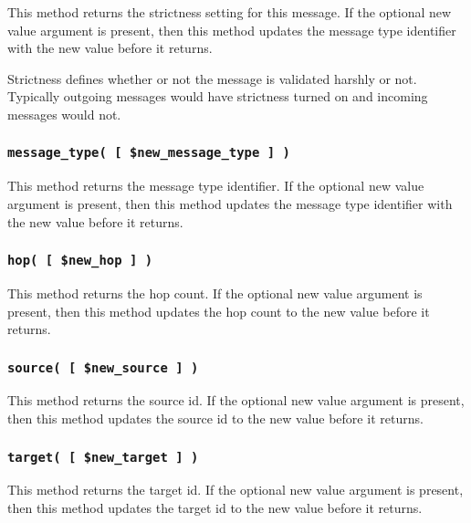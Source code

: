 \documentclass[12pt,a4paper]{article}
\begin{document}
This method returns the strictness setting for this message.  If the
optional new value argument is present, then this method updates the
message type identifier with the new value before it returns.



Strictness defines whether or not the message is validated harshly or
not.  Typically outgoing messages would have strictness turned on and
incoming messages would not.

\subsubsection*{\texttt{message\_type( [ \$new\_message\_type ] )}\label{xPL::Message_message_type_new_message_type_}}


This method returns the message type identifier.  If the optional new
value argument is present, then this method updates the message type
identifier with the new value before it returns.

\subsubsection*{\texttt{hop( [ \$new\_hop ] )}\label{xPL::Message_hop_new_hop_}}


This method returns the hop count.  If the optional new value argument
is present, then this method updates the hop count to the new value
before it returns.

\subsubsection*{\texttt{source( [ \$new\_source ] )}\label{xPL::Message_source_new_source_}}


This method returns the source id.  If the optional new value argument
is present, then this method updates the source id to the new value
before it returns.

\subsubsection*{\texttt{target( [ \$new\_target ] )}\label{xPL::Message_target_new_target_}}


This method returns the target id.  If the optional new value argument
is present, then this method updates the target id to the new value
before it returns.
\end{document}
